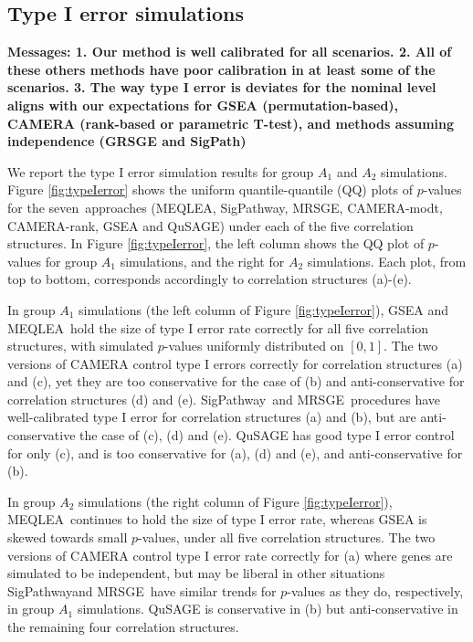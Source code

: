 \documentclass[a4,center,fleqn]{NAR}
\newcommand{\OurMethod}{MEQLEA}
\newcommand{\aaCase}{a}
\newcommand{\aCase}{c}
\newcommand{\cCase}{b}
\newcommand{\eCase}{d}
\newcommand{\fCase}{e}
\newcommand{\CMR}{CAMERA-rank}
\newcommand{\CMT}{CAMERA-modt}
\newcommand{\gent}{SigPathway}
\newcommand{\genr}{MRSGE}
\begin{document}
	
	
	\subsection{Type I error simulations}\label{subsection:typeIerror}
	
\textbf{	Messages: 1. Our method is well calibrated for all scenarios. 2. All of these others methods have poor calibration in at least some of the scenarios. 3. The way type I error is deviates for the nominal level aligns with our expectations for GSEA (permutation-based), CAMERA (rank-based or parametric T-test), and methods assuming independence (GRSGE and SigPath)}
	
	We report the type I error simulation results for group $A_1$ and $A_2$ simulations. Figure
	\ref{fig:typeIerror} shows the uniform quantile-quantile (QQ) plots of $p$-values for the
	seven~approaches (\OurMethod, \gent, \genr, \CMT, \CMR, GSEA and QuSAGE) under each of the five
	correlation structures. In Figure \ref{fig:typeIerror}, the left column shows the QQ plot of
	$p$-values for group $A_1$ simulations, and the right for $A_2$ simulations. Each plot, from top to
	bottom, corresponds accordingly to correlation structures (\aaCase)-(\fCase). 
	
	In group $A_1$ simulations (the left column of Figure \ref{fig:typeIerror}),  GSEA and
	\OurMethod~hold the size of type I error rate correctly for all five correlation structures, with
	simulated $p$-values uniformly distributed on $[0, 1]$. The two versions of CAMERA control type I
	errors correctly for correlation structures (\aaCase) and (\aCase), yet they are too conservative
	for the case of (\cCase) and anti-conservative for correlation structures (\eCase) and (\fCase).
	\gent~and \genr~procedures have well-calibrated type I error for correlation structures (\aaCase)
	and (\cCase), but are anti-conservative the case of (\aCase), (\eCase) and (\fCase). QuSAGE has good
	type I error control for only (\aCase), and is too conservative for (\aaCase), (\eCase) and
	(\fCase), and anti-conservative for (\cCase).
	
	In group $A_2$ simulations (the right column of Figure \ref{fig:typeIerror}),  \OurMethod~continues
	to hold the size of type I error rate, whereas GSEA is skewed towards small $p$-values, under all
	five correlation structures. The two versions of CAMERA control type I error rate correctly for
	(\aaCase) where genes are simulated to be independent, but may be liberal in other situations
	\gent and \genr~have similar trends for $p$-values as they do, respectively, in group $A_1$
	simulations. QuSAGE is conservative in (\cCase) but anti-conservative in the remaining four
	correlation structures.
	
\end{document}
